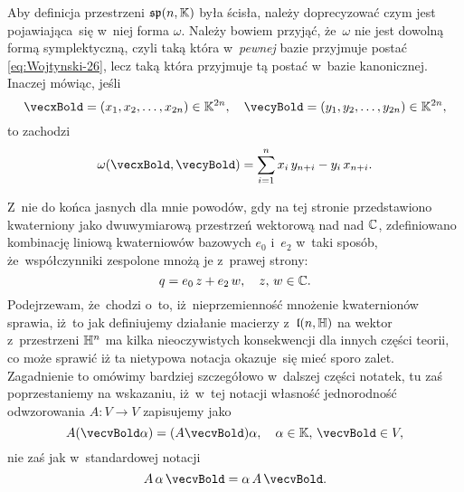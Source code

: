 \documentclass[a4paper,11pt]{article}
\numberwithin{equation}{section}
\begin{document}
\VerSpaceFour





\noindent
{} Aby definicja przestrzeni $\mathfrak{sp}( n, \mathbb{K} )$ była
ścisła, należy doprecyzować czym jest pojawiająca~się w~niej forma $\omega$.
Należy bowiem przyjąć, że~$\omega$ nie jest dowolną formą symplektyczną, czyli
taką która w~\textit{pewnej} bazie przyjmuje postać
\eqref{eq:Wojtynski-26}, lecz taką która przyjmuje tą postać w~bazie
kanonicznej. Inaczej mówiąc, jeśli
\begin{equation}
  \label{eq:Wojtynski-30}
  \vecxBold = ( x_{ 1 }, x_{ 2 }, \ldots, x_{ 2n } ) \in \Kbb^{ 2n }, \quad
  \vecyBold = ( y_{ 1 }, y_{ 2 }, \ldots, y_{ 2n } ) \in \Kbb^{ 2n },
\end{equation}
to zachodzi
\begin{equation}
  \label{eq:Wojtynski-31}
  \omega( \vecxBold, \vecyBold ) =
  \sum_{ i = 1 }^{ n } x_{ i } \, y_{ n + i } - y_{ i } \, x_{ n + i }.
\end{equation}

\VerSpaceFour





\noindent
{} Z~nie do końca jasnych dla mnie powodów, gdy na tej stronie
przedstawiono kwaterniony jako dwuwymiarową przestrzeń wektorową nad nad
$\mathbb{C}$, zdefiniowano kombinację liniową kwaterniowów bazowych $e_{ 0 }$
i~$e_{ 2 }$ w~taki sposób, że~współczynniki zespolone mnożą je z~prawej
strony:
\begin{equation}
  \label{eq:Wojtynski-32}
  q = e_{ 0 } \, z + e_{ 2 } \, w, \quad z, \, w \in \mathbb{C}.
\end{equation}
Podejrzewam, że~chodzi o~to, iż~nieprzemienność mnożenie kwaternionów
sprawia, iż~to jak definiujemy działanie macierzy z~$\mathfrak{l}( n, \mathbb{H} )$ na
wektor z~przestrzeni $\mathbb{H}^{ n }$ ma kilka nieoczywistych konsekwencji dla
innych części teorii, co może sprawić iż ta nietypowa notacja okazuje~się
mieć sporo zalet. Zagadnienie to omówimy bardziej szczegółowo w~dalszej
części notatek, tu zaś poprzestaniemy na wskazaniu, iż~w~tej notacji
własność jednorodność odwzorowania $A : V \to V$ zapisujemy jako
\begin{equation}
  \label{eq:Wojtynski-33}
  A ( \vecvBold \alpha ) = ( A \vecvBold ) \alpha, \quad
  \alpha \in \Kbb, \, \vecvBold \in V,
\end{equation}
nie zaś jak w~standardowej notacji
\begin{equation}
  \label{eq:Wojtynski-34}
  A \, \alpha \, \vecvBold = \alpha \, A \, \vecvBold.
\end{equation}
\end{document}
